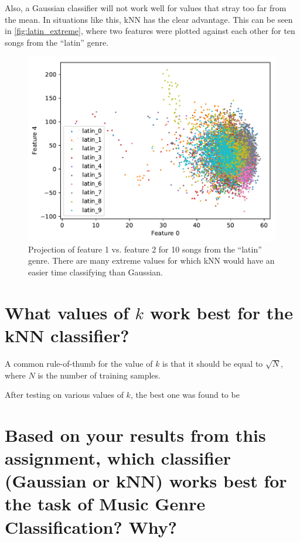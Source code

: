 \documentclass[a4paper,titlepage]{article}
\begin{document}
	Also, a Gaussian classifier will not work well for values that stray too far from the mean. In situations like this, kNN has the clear advantage. This can be seen in \autoref{fig:latin_extreme}, where two features were plotted against each other for ten songs from the ``latin'' genre.
	
	\begin{figure}[!htb]
		\centering
		\includegraphics[width=\columnwidth]{plots/latin_extreme.pdf}
		\caption
		{Projection of feature 1 vs. feature 2 for 10 songs from the ``latin'' genre. There are many extreme values for which kNN would have an easier time classifying than Gaussian.}
		\label{fig:latin_extreme}
	\end{figure}
	
	
	\section{What values of $k$ work best for the kNN classifier?}
	
	A common rule-of-thumb for the value of $k$ is that it should be equal to $\sqrt{N}$, where $N$ is the number of training samples. %
	
	After testing on various values of $k$, the best one was found to be %
	
	\section{Based on your results from this assignment, which classifier (Gaussian or kNN) works best for the task of Music Genre Classification? Why?}
	
\end{document}
